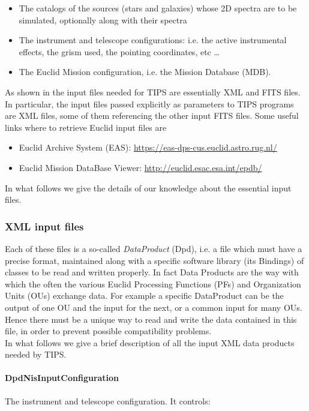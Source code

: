 \begin{itemize}
\item The catalogs of the sources (stars and galaxies) whose 2D spectra are to be simulated, optionally along with their spectra
\item The instrument and telescope configurations: i.e. the active instrumental effects, the grism used, the pointing coordinates, etc \dots
\item The Euclid Mission configuration, i.e. the Mission Database (MDB).
\end{itemize}

As shown in  the input files needed for TIPS are essentially XML and FITS files. In particular, the input files passed explicitly as parameters to TIPS programs are XML files, some of them referencing the other input FITS files. Some useful links where to retrieve Euclid input files are

\begin{itemize}
\item Euclid Archive System (EAS): \url{https://eas-dps-cus.euclid.astro.rug.nl/}
\item Euclid Mission DataBase Viewer: \url{http://euclid.esac.esa.int/epdb/}
\end{itemize}

In what follows we give the details of our knowledge about the essential input files.

\subsubsection{XML input files}
Each of these files is a so-called \emph{DataProduct} (Dpd), i.e. a file which must have a precise format, maintained along with a specific software library (its Bindings) of classes to be read and written properly. In fact Data Products are the way with which the often the various Euclid Processing Functions (PFs) and Organization Units (OUs) exchange data. For example a specific DataProduct can be the output of one OU and the input for the next, or a common input for many OUs. Hence there must be a unique way to read and write the data contained in this file, in order to prevent possible compatibility problems.\\
In what follows we give a brief description of all the input XML data products needed by TIPS.

\paragraph{DpdNisInputConfiguration} 
The instrument and telescope configuration. It controls:

